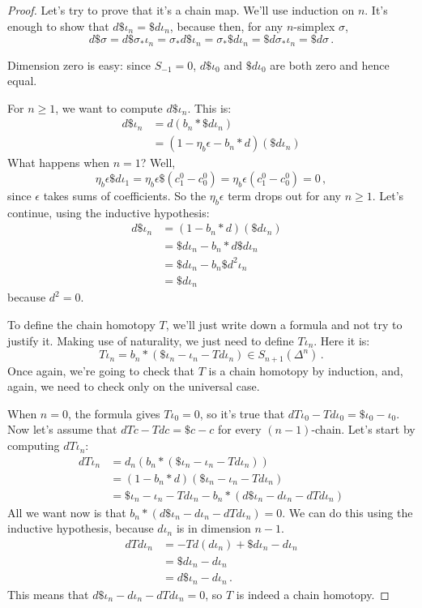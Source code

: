 \noindent
\begin{proof}
Let's try to prove that it's a chain map. We'll use induction on $n$. It's enough to show that $d\$\iota_n=\$ d\iota_n$, because then, for any $n$-simplex $\sigma$,
$$
d\$\sigma=d\$\sigma_\ast\iota_n=\sigma_\ast d\$\iota_n=\sigma_\ast \$d\iota_n=\$ d\sigma_\ast\iota_n=\$ d\sigma\,.
$$

Dimension zero is easy:
since $S_{-1}=0$, $d\$\iota_0$ and $\$d\iota_0$ are both zero and hence equal.

For $n\geq 1$, we want to compute $d\$\iota_n$. This is:
\begin{align*}
d\$\iota_n & =d(b_n\ast \$ d\iota_n)  \\
 & = (1-\eta_b\epsilon-b_n\ast d)(\$ d\iota_n)
\end{align*}
What happens when $n=1$? Well,
$$
\eta_b\epsilon\$d\iota_1 = \eta_b\epsilon \$(c^0_1 - c^0_0)=\eta_b\epsilon(c^0_1 - c^0_0)=0\,,
$$
since $\epsilon$ takes sums of coefficients. So the $\eta_b\epsilon$ term drops out for any $n\geq1$. Let's continue, using the inductive hypothesis:
\begin{align*}
d\$\iota_n & = (1 - b_n\ast d)(\$ d\iota_n) \\
 & = \$d\iota_n - b_n\ast d\$ d\iota_n  \\
 & = \$d\iota_n - b_n\$d^2\iota_n &\\
 & = \$d\iota_n 
\end{align*}
because $d^2=0$. 

To define the chain homotopy $T$, we'll just write down a formula and not try to justify it. Making use of naturality, we just need to define $T\iota_n$. 
Here it is:
\[
T\iota_n = b_n\ast(\$\iota_n - \iota_n - Td\iota_n)\in S_{n+1}(\Delta^n) \,.
\]
Once again, we're going to check that $T$ is a chain homotopy by induction, and, again, we need to check only on the universal case.

When $n=0$, the formula gives $T\iota_0=0$, so it's true that $dT\iota_0-Td\iota_0=\$\iota_0-\iota_0$.
Now let's assume that $dTc-Tdc=\$c-c$ for every $(n-1)$-chain. Let's start by computing $dT\iota_n$:
\begin{align*}
dT\iota_n & = d_n(b_n\ast(\$\iota_n - \iota_n - Td\iota_n)) \\
& = (1-b_n\ast d)(\$\iota_n - \iota_n - Td\iota_n) \\
& = \$\iota_n-\iota_n-Td\iota_n-b_n\ast (d\$\iota_n - d\iota_n - dTd\iota_n)
\end{align*}
All we want now is that $b_n\ast(d\$\iota_n - d\iota_n - dTd\iota_n)=0$. We can do this using the inductive hypothesis, because $d\iota_n$ is in dimension $n-1$.
\begin{align*}
dTd\iota_n & = -Td(d\iota_n)+\$ d\iota_n - d\iota_n\\
& = \$d\iota_n - d\iota_n\\
& = d\$\iota_n - d\iota_n\,.
\end{align*}
This means that $d\$\iota_n-d\iota_n - dTd\iota_n=0$, so $T$ is indeed a chain homotopy. 
\end{proof}
